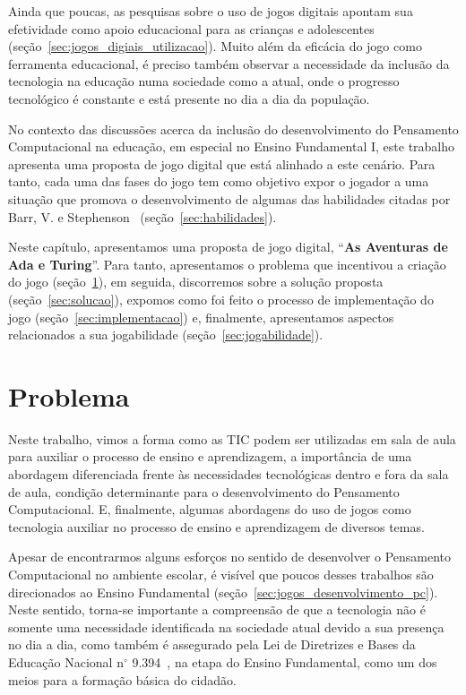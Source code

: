 Ainda que poucas, as pesquisas sobre o uso de jogos digitais apontam sua efetividade como apoio educacional para as crianças e adolescentes (seção~\ref{sec:jogos_digiais_utilizacao}). Muito além da eficácia do jogo como ferramenta educacional, é preciso também observar a necessidade da inclusão da tecnologia na educação numa sociedade como a atual, onde o progresso tecnológico é constante e está presente no dia a dia da população.

No contexto das discussões acerca da inclusão do desenvolvimento do Pensamento Computacional na educação, em especial no Ensino Fundamental I, este trabalho apresenta uma proposta de jogo digital que está alinhado a este cenário. Para tanto, cada uma das fases do jogo tem como objetivo expor o jogador a uma situação que promova o desenvolvimento de algumas das habilidades citadas por Barr, V. e Stephenson~\cite{barr_bringing_2011} (seção~\ref{sec:habilidades}).

Neste capítulo, apresentamos uma proposta de jogo digital, “\textbf{As Aventuras de Ada e Turing}”. Para tanto, apresentamos o problema que incentivou a criação do jogo (seção~\ref{sec:problema}), em seguida, discorremos sobre a solução proposta (seção~\ref{sec:solucao}), expomos como foi feito o processo de implementação do jogo (seção~\ref{sec:implementacao}) e, finalmente, apresentamos aspectos relacionados a sua jogabilidade (seção~\ref{sec:jogabilidade}).

\section{Problema} \label{sec:problema}

Neste trabalho, vimos a forma como as \acrlong{TIC} podem ser utilizadas em sala de aula para auxiliar o processo de ensino e aprendizagem, a importância de uma abordagem diferenciada frente às necessidades tecnológicas dentro e fora da sala de aula, condição determinante para o desenvolvimento do Pensamento Computacional. E, finalmente, algumas abordagens do uso de jogos como tecnologia auxiliar no processo de ensino e aprendizagem de diversos temas.

Apesar de encontrarmos alguns esforços no sentido de desenvolver o Pensamento Computacional no ambiente escolar, é visível que poucos desses trabalhos são direcionados ao Ensino Fundamental (seção~\ref{sec:jogos_desenvolvimento_pc}). Neste sentido, torna-se importante a compreensão de que a tecnologia não é somente uma necessidade identificada na sociedade atual devido a sua presença no dia a dia, como também é assegurado pela Lei de Diretrizes e Bases da Educação Nacional n$^{\circ}$ 9.394~\cite{brasil_lei_1996}, na etapa do Ensino Fundamental, como um dos meios para a formação básica do cidadão.

